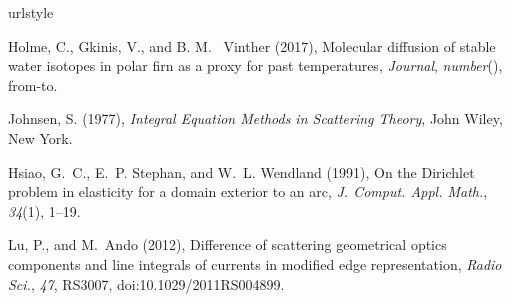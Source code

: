 \documentclass[draft, jgrga]{AGUTeX}
\begin{document}
\begin{article}



\begin{thebibliography}{}

\providecommand{\natexlab}[1]{#1}
\expandafter\ifx\csname urlstyle\endcsname\relax
  \providecommand{\doi}[1]{doi:\discretionary{}{}{}#1}\else
  \providecommand{\doi}{doi:\discretionary{}{}{}\begingroup
  \urlstyle{rm}\Url}\fi

Holme, C., Gkinis, V., and B. M. ~Vinther (2017), Molecular
diffusion of stable water isotopes in polar firn as a proxy
for past temperatures, \textit{Journal}, \textit{number}(),
from-to.

Johnsen, S. (1977), \textit{Integral Equation Methods in
  Scattering Theory}, John Wiley, New York.







Hsiao, G.~C., E.~P. Stephan, and W.~L. Wendland (1991), On the {D}irichlet
  problem in elasticity for a domain exterior to an arc, \textit{J. Comput.
  Appl. Math.}, \textit{34}(1), 1--19.

Lu, P., and M.~Ando (2012), Difference of scattering geometrical optics
  components and line integrals of currents in modified edge representation,
  \textit{Radio Sci.}, \textit{47},  RS3007, \doi{10.1029/2011RS004899}.

\end{thebibliography}




\end{article}
\end{document}
